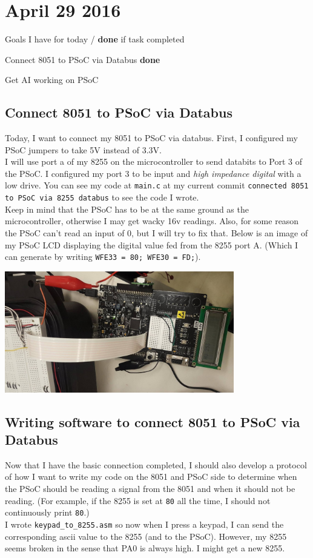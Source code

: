 \documentclass[12pt,twoside]{article}
\newenvironment{tight_itemize}{
\begin{itemize}
  \setlength{\itemsep}{0pt}
  \setlength{\parskip}{0pt}
}{\end{itemize}}
\begin{document}

\newpage
\section{April 29 2016}

Goals I have for today / {\bf done} if task completed
\begin{tight_itemize}
\item Connect 8051 to PSoC via Databus {\bf done}
\item Get AI working on PSoC
\end{tight_itemize}

\subsection{Connect 8051 to PSoC via Databus}
Today, I want to connect my 8051 to PSoC via databus. First, I configured my PSoC jumpers to take 5V instead of 3.3V. 
\\ I will use port a of my 8255 on the microcontroller to send databits to Port 3 of the PSoC. I configured my port 3 to be input and {\em high impedance digital} with a low drive. You can see my code at \texttt{main.c} at my current commit \texttt{connected 8051 to PSoC via 8255 databus} to see the code I wrote. 
\\ Keep in mind that the PSoC has to be at the same ground as the microcontroller, otherwise I may get wacky 16v readings. Also, for some reason the PSoC can't read an input of 0, but I will try to fix that.  Below is an image of my PSoC LCD displaying the digital value fed from the 8255 port A. (Which I can generate by writing \texttt{WFE33 = 80; WFE30 = FD;}). 
\begin{center}\includegraphics[width = 100mm]{Pics/4-29a.jpg}  \end{center}

\subsection{Writing software to connect 8051 to PSoC via Databus}
Now that I have the basic connection completed, I should also develop a protocol of how I want to write my code on the 8051 and PSoC side to determine when the PSoC should be reading a signal from the 8051 and when it should not be reading. (For example, if the 8255 is set at \texttt{80} all the time, I should not continuously print \texttt{80}.)
\\ I wrote \texttt{keypad\_to\_8255.asm} so now when I press a keypad, I can send the corresponding ascii value to the 8255 (and to the PSoC). However, my 8255 seems broken in the sense that PA0 is always high. I might get a new 8255. 
\end{document}
